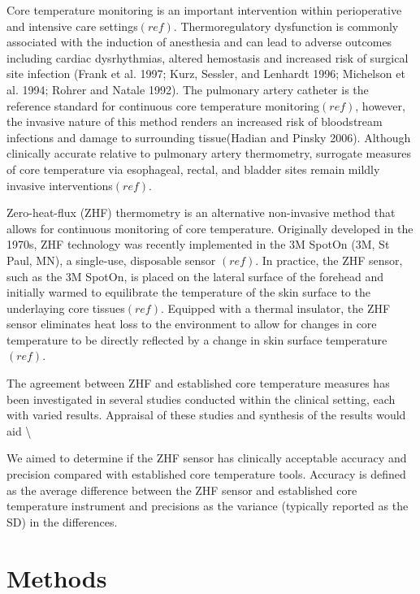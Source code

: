 \documentclass[smallextended]{svjour3}       %
\begin{document}
Core temperature monitoring is an important intervention within
perioperative and intensive care settings\((ref)\). Thermoregulatory
dysfunction is commonly associated with the induction of anesthesia and
can lead to adverse outcomes including cardiac dysrhythmias, altered
hemostasis and increased risk of surgical site infection (Frank et al.
1997; Kurz, Sessler, and Lenhardt 1996; Michelson et al. 1994; Rohrer
and Natale 1992). The pulmonary artery catheter is the reference
standard for continuous core temperature monitoring\((ref)\), however,
the invasive nature of this method renders an increased risk of
bloodstream infections and damage to surrounding tissue(Hadian and
Pinsky 2006). Although clinically accurate relative to pulmonary artery
thermometry, surrogate measures of core temperature via esophageal,
rectal, and bladder sites remain mildly invasive interventions\((ref)\).

Zero-heat-flux (ZHF) thermometry is an alternative non-invasive method
that allows for continuous monitoring of core temperature. Originally
developed in the 1970s, ZHF technology was recently implemented in the
3M SpotOn (3M, St Paul, MN), a single-use, disposable sensor \((ref)\).
In practice, the ZHF sensor, such as the 3M SpotOn, is placed on the
lateral surface of the forehead and initially warmed to equilibrate the
temperature of the skin surface to the underlaying core
tissues\((ref)\). Equipped with a thermal insulator, the ZHF sensor
eliminates heat loss to the environment to allow for changes in core
temperature to be directly reflected by a change in skin surface
temperature \((ref)\).

The agreement between ZHF and established core temperature measures has
been investigated in several studies conducted within the clinical
setting, each with varied results. Appraisal of these studies and
synthesis of the results would aid
\textbackslash{}

We aimed to determine if the ZHF sensor has clinically acceptable
accuracy and precision compared with established core temperature tools.
Accuracy is defined as the average difference between the ZHF sensor and
established core temperature instrument and precisions as the variance
(typically reported as the SD) in the differences.

\hypertarget{methods}{%
\section{Methods}\label{methods}}
\end{document}
